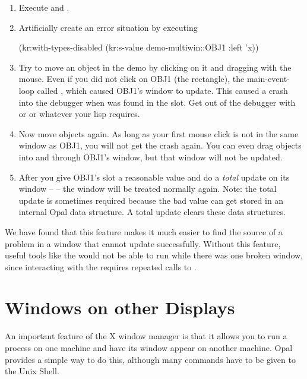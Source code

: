 \begin{enumerate}
\item Execute  and
 .

\item Artificially create an error situation by executing
\begin{programexample}
(kr:with-types-disabled
 (kr:s-value demo-multiwin::OBJ1 :left 'x))
\end{programexample}

\item Try to move an object in the demo by clicking on it and dragging with the
mouse.  Even if you did not click on OBJ1 (the rectangle), the main-event-loop
called , which caused OBJ1's window to update.  This
caused a crash into the debugger when  was found in the 
slot.  Get out of the debugger with  or  or whatever your
lisp requires.

\item Now move objects again.  As long as your first mouse click is not in the same
window as OBJ1, you will not get the crash again.  You can even drag
objects into and through OBJ1's window, but that window will not be
updated.

\item After you give OBJ1's  slot a reasonable value and do a {\it total}
update on its window --  -- the window
will be treated normally again.  Note: the total update is sometimes required
because the bad  value can get stored in an internal Opal data
structure.  A total update clears these data structures.
\end{enumerate}

We have found that this feature makes it much easier to find the source
of a problem in a window that cannot update successfully.  Without this
feature, useful tools like the  would not be able to run
while there was one broken window, since interacting with the 
requires repeated calls to .



\section{Windows on other Displays}
 

An important feature of the X window manager is that it allows you to run a
process on one machine and have its window appear on another machine.  Opal
provides a simple way to do this, although many commands have to be given
to the Unix Shell.

